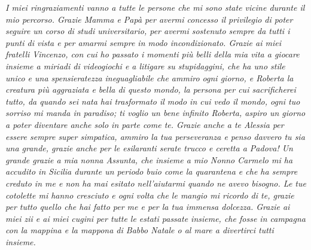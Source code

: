 \noindent \textit{I miei ringraziamenti vanno a tutte le persone che mi sono state vicine durante il mio percorso. Grazie Mamma e Papà per avermi concesso il privilegio di poter seguire un corso di studi universitario, per avermi sostenuto sempre da tutti i punti di vista e per amarmi sempre in modo incondizionato.
                  Grazie ai miei fratelli Vincenzo, con cui ho passato i momenti più belli della mia vita a giocare insieme a miriadi di videogiochi e a litigare su stupidaggini, che ha uno stile unico e una spensieratezza ineguagliabile che ammiro ogni giorno, e Roberta la creatura più aggraziata e bella di questo mondo, la persona per cui sacrificherei tutto, da quando sei nata hai trasformato il modo in cui vedo il mondo, ogni tuo sorriso mi manda in paradiso; ti voglio un bene infinito Roberta, aspiro un giorno a poter diventare anche solo in parte come te. Grazie anche a te Alessia per essere sempre super simpatica, ammiro la tua perseveranza e penso davvero tu sia una grande, grazie anche per le esilaranti serate trucco e ceretta a Padova!
                  Un grande grazie a mia nonna Assunta, che insieme a mio Nonno Carmelo mi ha accudito in Sicilia durante un periodo buio come la quarantena e che ha sempre creduto in me e non ha mai esitato nell'aiutarmi quando ne avevo bisogno. Le tue cotolette mi hanno cresciuto e ogni volta che le mangio mi ricordo di te, grazie per tutto quello che hai fatto per me e per la tua immensa dolcezza.
                  Grazie ai miei zii e ai miei cugini per tutte le estati passate insieme, che fosse in campagna con la mappina e la mappona di Babbo Natale o al mare a divertirci tutti insieme.}\\
\newline
